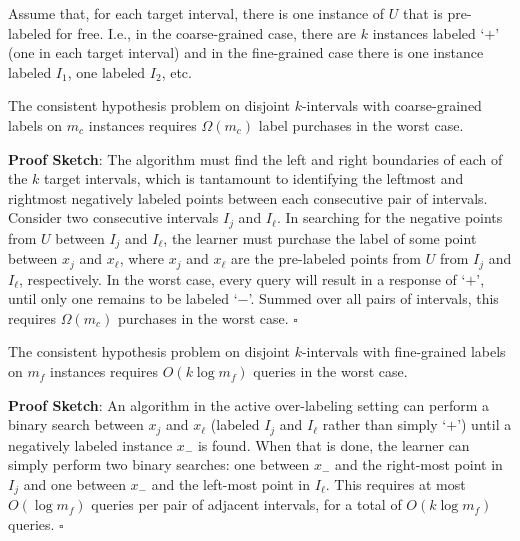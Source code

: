 Assume that, for each target interval, there is
one instance of  $U$ that is pre-labeled for free.  I.e., in the 
coarse-grained case, there are $k$ instances labeled `$+$' (one in each target
interval) and in the fine-grained case there is one instance labeled $I_1$,
one labeled $I_2$, etc. 

\begin{obs}
The consistent hypothesis problem on disjoint $k$-intervals
with coarse-grained labels on $m_c$ instances requires
$\Omega(m_c)$ label purchases in the worst case.
\end{obs}
{\bf Proof Sketch}:  
The algorithm must find the
left and right boundaries of each of the $k$ target intervals, which
is tantamount to identifying the leftmost and rightmost negatively
labeled points between each consecutive pair of intervals.  Consider
two consecutive intervals $I_j$ and $I_\ell$. 
In searching for
the negative points from $U$ between $I_j$ and
$I_\ell$, the learner must purchase the label of some point between $x_j$ and
$x_\ell$, where $x_j$ and $x_\ell$ are the pre-labeled points from
$U$ from $I_j$ and $I_\ell$, respectively.
In the worst case, every query will result in a 
response of `$+$', until only one remains to be labeled
`$-$'.  Summed over all pairs of intervals, this 
requires $\Omega(m_c)$ purchases in the worst case. 
 \hfill $\square$

\begin{obs}
The consistent hypothesis problem on disjoint $k$-intervals
with fine-grained labels on $m_f$ instances
requires $O(k \log m_f)$ queries in the worst case.
\end{obs}
{\bf Proof Sketch}:  
An algorithm in the active over-labeling setting 
can perform a binary search between $x_j$ and $x_\ell$  (labeled
$I_j$ and $I_\ell$ rather than simply `$+$') until a negatively labeled
instance $x_-$ is found.  When
that is done, the learner can simply perform two binary searches: one between $x_-$ and
the right-most point in $I_j$ and one between $x_-$ and
the left-most point in $I_\ell$. This requires at most $O(\log m_f)$ queries
per pair of adjacent intervals, for a total of $O(k \log m_f)$ queries. 
 \hfill $\square$


